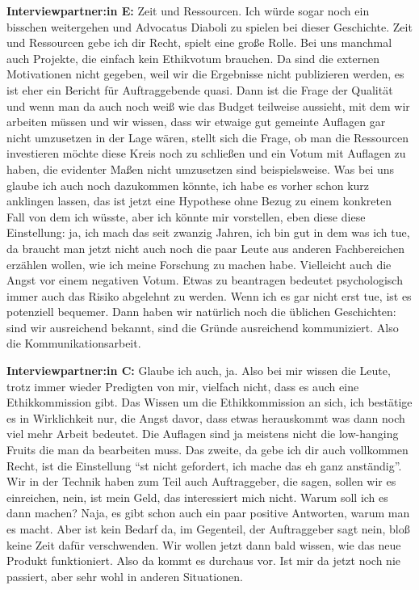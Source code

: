 \documentclass[a4paper,12pt,twoside]{scrreprt}
\begin{document}
\textbf{Interviewpartner:in E:} Zeit und Ressourcen. Ich würde sogar noch ein bisschen weitergehen und Advocatus Diaboli zu spielen bei dieser Geschichte. Zeit und Ressourcen gebe ich dir Recht, spielt eine große Rolle. Bei uns manchmal auch Projekte, die einfach kein Ethikvotum brauchen. Da sind die externen Motivationen nicht gegeben, weil wir die Ergebnisse nicht publizieren werden, es ist eher ein Bericht für Auftraggebende quasi. Dann ist die Frage der Qualität und wenn man da auch noch weiß wie das Budget teilweise aussieht, mit dem wir arbeiten müssen und wir wissen, dass wir etwaige gut gemeinte Auflagen gar nicht umzusetzen in der Lage wären, stellt sich die Frage, ob man die Ressourcen investieren möchte diese Kreis noch zu schließen und ein Votum mit Auflagen zu haben, die evidenter Maßen nicht umzusetzen sind beispielsweise. Was bei uns glaube ich auch noch dazukommen könnte, ich habe es vorher schon kurz anklingen lassen, das ist jetzt eine Hypothese ohne Bezug zu einem konkreten Fall von dem ich wüsste, aber ich könnte mir vorstellen, eben diese diese Einstellung: ja, ich mach das seit zwanzig Jahren, ich bin gut in dem was ich tue, da braucht man jetzt nicht auch noch die paar Leute aus anderen Fachbereichen erzählen wollen, wie ich meine Forschung zu machen habe. Vielleicht auch die Angst vor einem negativen Votum. Etwas zu beantragen bedeutet psychologisch immer auch das Risiko abgelehnt zu werden. Wenn ich es gar nicht erst tue, ist es potenziell bequemer. Dann haben wir natürlich noch die üblichen Geschichten: sind wir ausreichend bekannt, sind die Gründe ausreichend kommuniziert. Also die Kommunikationsarbeit.

\textbf{Interviewpartner:in C:} Glaube ich auch, ja. Also bei mir wissen die Leute, trotz immer wieder Predigten von mir, vielfach nicht, dass es auch eine Ethikkommission gibt. Das Wissen um die Ethikkommission an sich, ich bestätige es in Wirklichkeit nur, die Angst davor, dass etwas herauskommt was dann noch viel mehr Arbeit bedeutet. Die Auflagen sind ja meistens nicht die low-hanging Fruits die man da bearbeiten muss. Das zweite, da gebe ich dir auch vollkommen Recht, ist die Einstellung \enquote{st nicht gefordert, ich mache das eh ganz anständig}. Wir in der Technik haben zum Teil auch Auftraggeber, die sagen, sollen wir es einreichen, nein, ist mein Geld, das interessiert mich nicht. Warum soll ich es dann machen? Naja, es gibt schon auch ein paar positive Antworten, warum man es macht. Aber ist kein Bedarf da, im Gegenteil, der Auftraggeber sagt nein, bloß keine Zeit dafür verschwenden. Wir wollen jetzt dann bald wissen, wie das neue Produkt funktioniert. Also da kommt es durchaus vor. Ist mir da jetzt noch nie passiert, aber sehr wohl in anderen Situationen.
\end{document}
